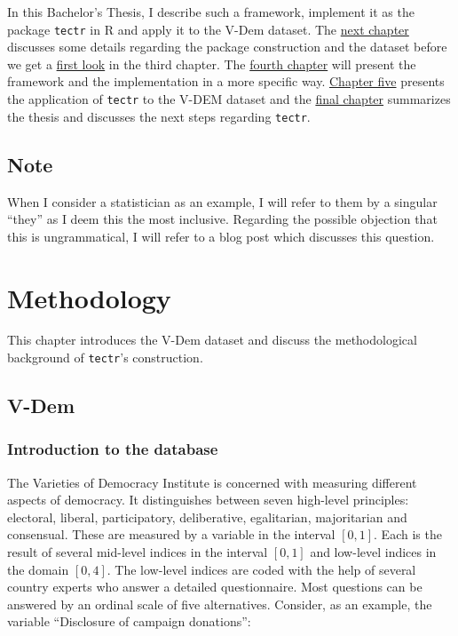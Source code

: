 \documentclass[]{report}
\theoremstyle{definition}
\theoremstyle{definition}
\theoremstyle{definition}
\theoremstyle{remark}
\begin{document}
In this Bachelor's Thesis, I describe such a framework, implement it as
the package \texttt{tectr} in R and apply it to the V-Dem dataset. The
\protect\hyperlink{methods}{next chapter} discusses some details
regarding the package construction and the dataset before we get a
\protect\hyperlink{example}{first look} in the third chapter. The
\protect\hyperlink{concept}{fourth chapter} will present the framework
and the implementation in a more specific way.
\protect\hyperlink{application}{Chapter five} presents the application
of \texttt{tectr} to the V-DEM dataset and the
\protect\hyperlink{summary}{final chapter} summarizes the thesis and
discusses the next steps regarding \texttt{tectr}.

\section*{Note}\label{note}


When I consider a statistician as an example, I will refer to them by a
singular ``they'' as I deem this the most inclusive. Regarding the
possible objection that this is ungrammatical, I will refer to a blog
post \citep{Soanes2012} which discusses this question.

\hypertarget{methods}{\chapter{Methodology}\label{methods}}

This chapter introduces the V-Dem dataset and discuss the methodological
background of \texttt{tectr}'s construction.

\section{V-Dem}\label{v-dem}

\subsection{Introduction to the
database}\label{introduction-to-the-database}

The Varieties of Democracy Institute is concerned with measuring
different aspects of democracy. It distinguishes between seven
high-level principles: electoral, liberal, participatory, deliberative,
egalitarian, majoritarian and consensual. These are measured by a
variable in the interval \([0,1]\). Each is the result of several
mid-level indices in the interval \([0,1]\) and low-level indices in the
domain \([0,4]\). The low-level indices are coded with the help of
several country experts who answer a detailed questionnaire. Most
questions can be answered by an ordinal scale of five alternatives.
Consider, as an example, the variable ``Disclosure of campaign
donations'':
\end{document}
